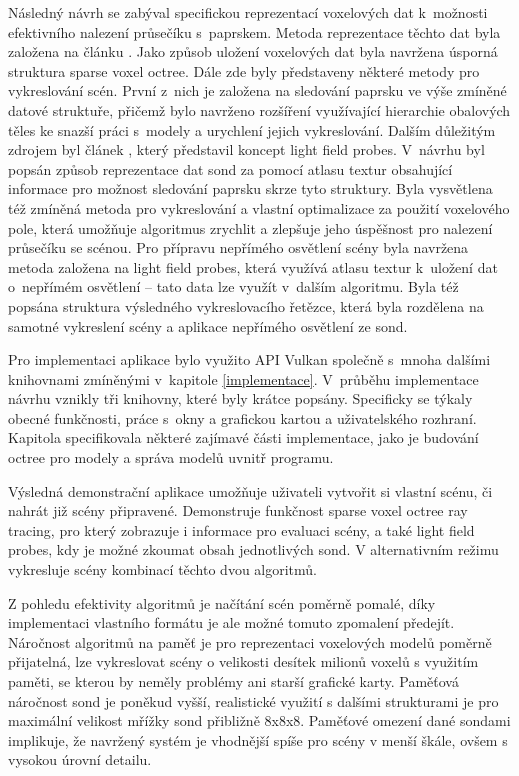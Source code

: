 Následný návrh se zabýval specifickou reprezentací voxelových dat k~možnosti efektivního nalezení průsečíku s~paprskem. Metoda reprezentace těchto dat byla založena na článku \cite{Laine2011EfficientSV}. Jako způsob uložení voxelových dat byla navržena úsporná struktura sparse voxel octree. Dále zde byly představeny některé metody pro vykreslování scén. První z~nich je založena na sledování paprsku ve výše zmíněné datové struktuře, přičemž bylo navrženo rozšíření využívající hierarchie obalových těles ke snazší práci s~modely a urychlení jejich vykreslování. Dalším důležitým zdrojem byl článek \cite{light_field_probes}, který představil koncept light field probes. V~návrhu byl popsán způsob reprezentace dat sond za pomocí atlasu textur obsahující informace pro možnost sledování paprsku skrze tyto struktury. Byla vysvětlena též zmíněná metoda pro vykreslování a vlastní optimalizace za použití voxelového pole, která umožňuje algoritmus zrychlit a zlepšuje jeho úspěšnost pro nalezení průsečíku se scénou. Pro přípravu nepřímého osvětlení scény byla navržena metoda založena na light field probes, která využívá atlasu textur k~uložení dat o~nepřímém osvětlení -- tato data lze využít v~dalším algoritmu. Byla též popsána struktura výsledného vykreslovacího řetězce, která byla rozdělena na samotné vykreslení scény a aplikace nepřímého osvětlení ze sond.

Pro implementaci aplikace bylo využito API Vulkan společně s~mnoha dalšími knihovnami zmíněnými v~kapitole \ref{implementace}. V~průběhu implementace návrhu vznikly tři knihovny, které byly krátce popsány. Specificky se týkaly obecné funkčnosti, práce s~okny a grafickou kartou a uživatelského rozhraní. Kapitola specifikovala některé zajímavé části implementace, jako je budování octree pro modely a správa modelů uvnitř programu.

Výsledná demonstrační aplikace umožňuje uživateli vytvořit si vlastní scénu, či nahrát již scény připravené. Demonstruje funkčnost sparse voxel octree ray tracing, pro který zobrazuje i informace pro evaluaci scény, a také light field probes, kdy je možné zkoumat obsah jednotlivých sond. V alternativním režimu vykresluje scény kombinací těchto dvou algoritmů.

Z pohledu efektivity algoritmů je načítání scén poměrně pomalé, díky implementaci vlastního formátu je ale možné tomuto zpomalení předejít. Náročnost algoritmů na paměť je pro reprezentaci voxelových modelů poměrně přijatelná, lze vykreslovat scény o velikosti desítek milionů voxelů s využitím paměti, se kterou by neměly problémy ani starší grafické karty. Paměťová náročnost sond je poněkud vyšší, realistické využití s dalšími strukturami je pro maximální velikost mřížky sond přibližně 8x8x8. Paměťové omezení dané sondami implikuje, že navržený systém je vhodnější spíše pro scény v menší škále, ovšem s vysokou úrovní detailu.

